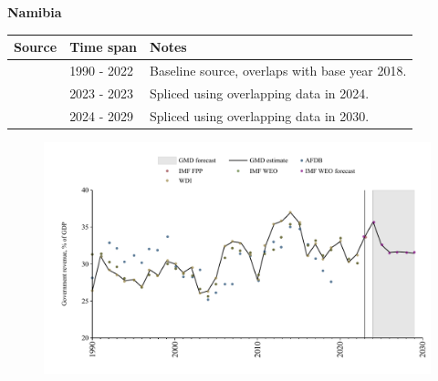 \documentclass[12pt,a4paper,landscape]{article}
\begin{document}
\begin{adjustbox}{max totalsize={\paperwidth}{\paperheight},center}
\begin{minipage}[t][\textheight][t]{\textwidth}
\vspace*{0.5cm}
{}
\begin{center}
{\Large\bfseries Namibia}
\end{center}
\vspace{0.5cm}
\begin{table}[H]
\centering
\small
\begin{tabular}{|l|l|l|}
\hline
\textbf{Source} & \textbf{Time span} & \textbf{Notes} \\
\hline
\rowcolor{white}\cite{WDI}& 1990 - 2022 &Baseline source, overlaps with base year 2018.\\
\rowcolor{lightgray}\cite{IMF_FPP}& 2023 - 2023 &Spliced using overlapping data in 2024.\\
\rowcolor{white}\cite{IMF_WEO_forecast}& 2024 - 2029 &Spliced using overlapping data in 2030.\\
\hline
\end{tabular}
\end{table}
\begin{figure}[H]
\centering
\includegraphics[width=\textwidth,height=0.6\textheight,keepaspectratio]{graphs/NAM_govrev_GDP.pdf}
\end{figure}
\end{minipage}
\end{adjustbox}
\end{document}
